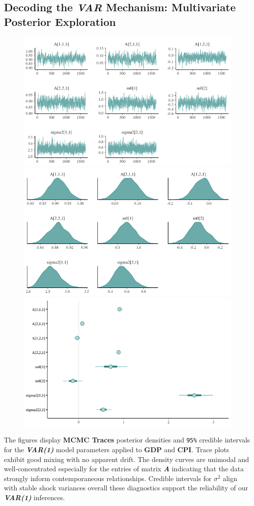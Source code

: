 \documentclass{Configuration_Files/PoliMi3i_thesis}
\begin{document}
\newpage
\subsection{Decoding the \textbf{\textit{VAR}} Mechanism: Multivariate Posterior Exploration}
\begin{figure}[H]
    \centering
    \includegraphics[width=0.55\linewidth]{GDP_VAR_TRACE1.png}
    \vspace{0.5em}
    
    \includegraphics[width=0.55\linewidth]{GDP_VAR_DENSITY1.png}
    \vspace{0.5em}
    
    \includegraphics[width=0.55\linewidth]{GDP_VAR_INTERVAL1.png}
\end{figure}

The figures display \textbf{MCMC Traces} posterior densities and \texttt{95\%} credible intervals for the \textbf{\textit{VAR(1)}} model parameters applied to \textbf{GDP} and \textbf{CPI}. Trace plots exhibit good mixing with no apparent drift. The density curves are unimodal and well‐concentrated especially for the entries of matrix \textbf{\textit{A}} indicating that the data strongly inform contemporaneous relationships. Credible intervals for
\(\sigma^{2}\) align with stable shock variances overall these diagnostics support the reliability of our \textbf{\textit{VAR(1)}} inferences.
\newpage
\end{document}
